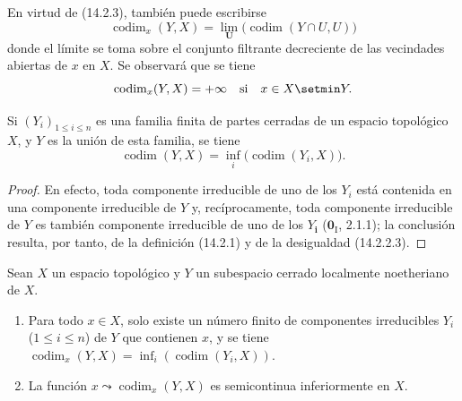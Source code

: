 En virtud de (14.2.3), también puede escribirse
\[
  \operatorname{codim}_x(Y,X)=
  \lim_{\mathbf U}\bigl(\operatorname{codim}(Y\cap U,U)\bigr)
  \tag{14.2.4.1}\label{0.14.2.4.1-fr}
\]
donde el límite se toma sobre el conjunto filtrante decreciente de las
vecindades abiertas de $x$ en $X$. Se observará que se tiene
\[
  \operatorname{codim}_x(Y,X)=+\infty\quad\text{si}\quad x\in X\setmin Y.
\]

\begin{proposition}[14.2.5]
\label{0.14.2.5-fr}
Si $(Y_i)_{1\leq i\leq n}$ es una familia finita de partes cerradas de un
espacio topológico $X$, y $Y$ es la unión de esta familia, se tiene
\[
  \operatorname{codim}(Y,X)=
  \inf_i\bigl(\operatorname{codim}(Y_i,X)\bigr).
  \tag{14.2.5.1}\label{0.14.2.5.1-fr}
\]
\end{proposition}

\begin{proof}
En efecto, toda componente irreducible de uno de los $Y_i$ está contenida en
una componente irreducible de $Y$ y, recíprocamente, toda componente
irreducible de $Y$ es también componente irreducible de uno de los $Y_{\boldsymbol{i}}$
($\mathbf{0}_{\mathrm I}$, 2.1.1); la conclusión resulta, por tanto, de la definición
(14.2.1) y de la desigualdad (14.2.2.3).
\end{proof}

\begin{corollary}[14.2.6]
\label{0.14.2.6-fr}
Sean $X$ un espacio topológico y $Y$ un subespacio cerrado localmente
noetheriano de $X$.
\begin{enumerate}
  \item[\rm(i)] Para todo $x\in X$, solo existe un número finito de
  componentes irreducibles $Y_i$ \textup{($1\leq i\leq n$)} de $Y$ que contienen $x$,
  y se tiene
  $\operatorname{codim}_x(Y,X)=
  \inf_i(\operatorname{codim}(Y_i,X))$.
  \item[\rm(ii)] La función
  $x\leadsto\operatorname{codim}_x(Y,X)$ es semicontinua inferiormente en $X$.
\end{enumerate}
\end{corollary}

